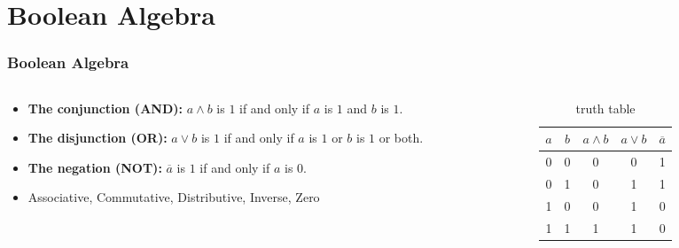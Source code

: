 \documentclass{beamer}
\begin{document}
\section{Boolean Algebra}
\begin{frame}\frametitle{Boolean Algebra}
  \begin{columns}
  \begin{column}{6cm}
  \begin{itemize}
    \item \textbf{The conjunction (AND):} $a\land b$ is $1$ if and only if $a$ is $1$ and $b$ is $1$.\\
    \item \textbf{The disjunction (OR):} $a\lor b$  is $1$ if and only if $a$ is $1$ or $b$ is $1$ or both.\\
    \item \textbf{The negation (NOT):}  $\overline{a}$ is $1$ if and only if $a$ is $0$.
    \item Associative, Commutative, Distributive, Inverse, Zero
  \end{itemize}
  \end{column}
  
    
  \begin{column}{6cm}
  \begin{table}[H]
  \centering
  \begin{tabular}{c|c||c|c|c}
  \textbf{$a$} & \textbf{$b$} & \textbf{$a\land b$} & \textbf{$a\lor b$} & \textbf{$\overline{a}$} \\ \hline
  0          & 0          & 0            & 0            & 1           \\
  0          & 1          & 0            & 1            & 1           \\
  1          & 0          & 0            & 1            & 0           \\
  1          & 1          & 1            & 1            & 0          
  \end{tabular}
  \caption{truth table}
  \label{tab:truth}
  \end{table}
  \end{column}
  
  \end{columns}
\end{frame}
\end{document}
